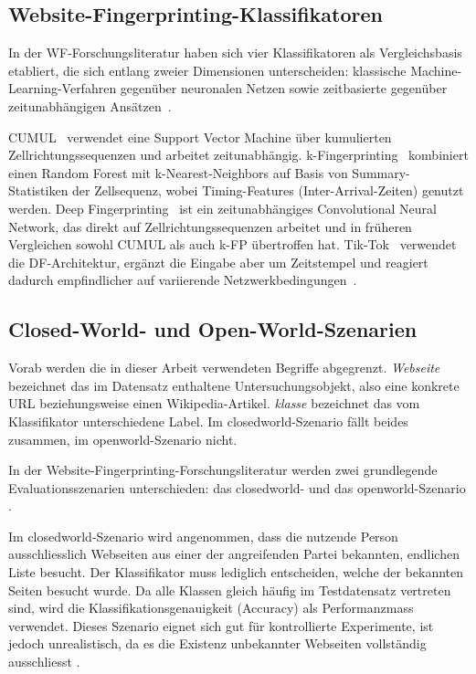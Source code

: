 \subsection{Website-Fingerprinting-Klassifikatoren}

In der WF-Forschungsliteratur haben sich vier Klassifikatoren als Vergleichsbasis etabliert, die sich entlang zweier Dimensionen unterscheiden: klassische Machine-Learning-Verfahren gegenüber neuronalen Netzen sowie zeitbasierte gegenüber zeitunabhängigen Ansätzen~\cite{jansen2023data}.


CUMUL~\cite{panchenko2016website} verwendet eine Support Vector Machine über kumulierten Zellrichtungssequenzen und arbeitet zeitunabhängig.
k-Fingerprinting~\cite{hayes2016k} kombiniert einen Random Forest mit k-Nearest-Neighbors auf Basis von Summary-Statistiken der Zellsequenz, wobei Timing-Features (Inter-Arrival-Zeiten) genutzt werden.
Deep Fingerprinting~\cite{sirinam2018deep} ist ein zeitunabhängiges Convolutional Neural Network, das direkt auf Zellrichtungssequenzen arbeitet und in früheren Vergleichen sowohl CUMUL als auch k-FP übertroffen hat.
Tik-Tok~\cite{rahman2019tik} verwendet die DF-Architektur, ergänzt die Eingabe aber um Zeitstempel und reagiert dadurch empfindlicher auf variierende Netzwerkbedingungen~\cite{jansen2023data}.




\subsection{Closed-World- und Open-World-Szenarien}
\label{sec:closed_open_world}

Vorab werden die in dieser Arbeit verwendeten Begriffe abgegrenzt.
\emph{Webseite} bezeichnet das im Datensatz enthaltene Untersuchungsobjekt, also eine konkrete URL beziehungsweise einen Wikipedia-Artikel.
\emph{\gls{klasse}} bezeichnet das vom Klassifikator unterschiedene Label.
Im \gls{closedworld}-Szenario fällt beides zusammen, im \gls{openworld}-Szenario nicht.

In der Website-Fingerprinting-Forschungsliteratur werden zwei grundlegende
Evaluationsszenarien unterschieden: das \gls{closedworld}- und das
\gls{openworld}-Szenario \cite{wang2016realistically, jansen2023data}.

Im \gls{closedworld}-Szenario wird angenommen, dass die nutzende Person
ausschliesslich Webseiten aus einer der angreifenden Partei bekannten,
endlichen Liste besucht. Der Klassifikator muss 
lediglich entscheiden, welche der bekannten Seiten besucht wurde. 
Da alle Klassen gleich häufig im Testdatensatz vertreten sind, 
wird die Klassifikationsgenauigkeit (Accuracy) als Performanzmass 
verwendet. Dieses Szenario eignet sich gut für kontrollierte 
Experimente, ist jedoch unrealistisch, da es die Existenz 
unbekannter Webseiten vollständig ausschliesst
\cite{wang2016realistically}.

